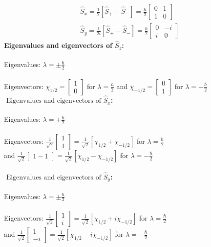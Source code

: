 $$\begin{aligned}
	&\hat{S}_{x}=\frac{1}{2}\left[\hat{S}_{+}+\hat{S}_{-}\right]=\frac{\hbar}{2}\left[\begin{array}{ll}
		0 & 1 \\
		1 & 0
	\end{array}\right] \\
	&\hat{S}_{y}=\frac{1}{2 i}\left[\hat{S}_{+}-\hat{S}_{-}\right]=\frac{\hbar}{2}\left[\begin{array}{ll}
		0 & -i \\
		i & 0
	\end{array}\right]
\end{aligned}$$
\textbf{ Eigenvalues and eigenvectors of  $\hat{S}_{z}$:}\\\\
Eigenvalues: $\lambda=\pm \frac{\hbar}{2}$\\\\
Eigenvectors: $\chi_{1 / 2}=\left[\begin{array}{l}1 \\ 0\end{array}\right]$ for $\lambda=\frac{\hbar}{2}$ and $\chi_{-1 / 2}=\left[\begin{array}{c}0 \\ 1\end{array}\right]$ for $\lambda=-\frac{\hbar}{2}$\\
\textbf{$\text { Eigenvalues and eigenvectors of } \hat{S}_{x}$:}\\\\
Eigenvalues: $\lambda=\pm \frac{\hbar}{2}$\\\\
Eigenvectors: $\frac{1}{\sqrt{2}}\left[\begin{array}{l}1 \\ 1\end{array}\right]=\frac{1}{\sqrt{2}}\left[\chi_{1 / 2}+\chi_{-1 / 2}\right]$ for $\lambda=\frac{\hbar}{2}$\\
and $\frac{1}{\sqrt{2}}\left[\begin{array}{l}1  -1\end{array}\right]=\frac{1}{\sqrt{2}}\left[\chi_{1 / 2}-\chi_{-1 / 2}\right]$ for $\lambda=-\frac{\hbar}{2}$\\\\
\textbf{$\text { Eigenvalues and eigenvectors of } \hat{S}_{y}$:}\\\\
Eigenvalues: $\lambda=\pm \frac{\hbar}{2}$\\\\
Eigenvectors: $\frac{1}{\sqrt{2}}\left[\begin{array}{l}1 \\ i\end{array}\right]=\frac{1}{\sqrt{2}}\left[\chi_{1 / 2}+i \chi_{-1 / 2}\right]$ for $\lambda=\frac{\hbar}{2}$\\
and $\frac{1}{\sqrt{2}}\left[\begin{array}{l}1 \\ -i\end{array}\right]=\frac{1}{\sqrt{2}}\left[\chi_{1 / 2}-i \chi_{-1 / 2}\right]$ for $\lambda=-\frac{\hbar}{2}$\\\\
